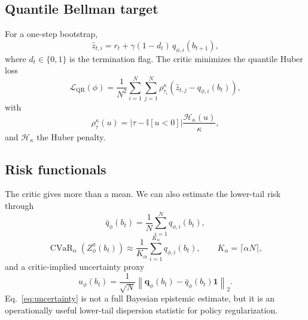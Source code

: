 \documentclass[conference]{IEEEtran}
\newcommand{\cvar}{\operatorname{CVaR}}
\begin{document}
\subsection{Quantile Bellman target}
For a one-step bootstrap,
\begin{equation}
\hat{z}_{t,i}
=
r_t + \gamma(1-d_t)\, q_{\phi,i}(b_{t+1}),
\end{equation}
where \(d_t\in\{0,1\}\) is the termination flag. The critic minimizes the quantile Huber loss
\begin{equation}
\label{eq:qrloss}
\mathcal{L}_{\mathrm{QR}}(\phi)
=
\frac{1}{N^2}
\sum_{i=1}^N \sum_{j=1}^N
\rho_{\tau_i}^{\kappa}\!\left(\hat{z}_{t,j}-q_{\phi,i}(b_t)\right),
\end{equation}
with
\begin{equation}
\rho_{\tau}^{\kappa}(u)
=
\left|\tau-\mathbb{I}[u<0]\right| \frac{\mathcal{H}_{\kappa}(u)}{\kappa},
\end{equation}
and \(\mathcal{H}_\kappa\) the Huber penalty.

\subsection{Risk functionals}
The critic gives more than a mean. We can also estimate the lower-tail risk through
\begin{equation}
\bar{q}_\phi(b_t)=\frac{1}{N}\sum_{i=1}^N q_{\phi,i}(b_t),
\end{equation}
\begin{equation}
\label{eq:cvar}
\cvar_\alpha\!\left(Z_\phi^\pi(b_t)\right)
\approx
\frac{1}{K_\alpha}\sum_{i=1}^{K_\alpha} q_{\phi,i}(b_t),
\qquad
K_\alpha = \lceil \alpha N \rceil,
\end{equation}
and a critic-implied uncertainty proxy
\begin{equation}
\label{eq:uncertainty}
u_\phi(b_t)
=
\frac{1}{\sqrt{N}}
\left\|
\bm q_\phi(b_t)-\bar{q}_\phi(b_t)\bm 1
\right\|_2 .
\end{equation}
Eq.~\eqref{eq:uncertainty} is not a full Bayesian epistemic estimate, but it is an operationally useful lower-tail dispersion statistic for policy regularization.
\end{document}
